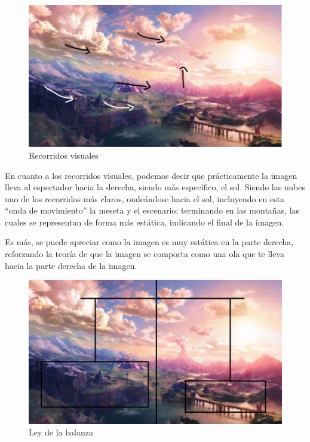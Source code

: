 \documentclass[12pt]{article}
\begin{document}
         \newpage
          \begin{figure}[H]
            \centering
            \includegraphics[width=\textwidth]{images/Jesus/Seccion2/Group 2.JPEG}
            \caption{Recorridos visuales}
          \end{figure}
          En cuanto a los recorridos visuales, podemos decir que prácticamente la imagen lleva al espectador hacia la derecha, siendo más específico, el sol. 
          Siendo las nubes uno de los recorridos más claros, ondeándose hacia el sol, incluyendo en esta “onda de movimiento” la meseta y el escenario; terminando en las montañas, las cuales se representan de forma más estática, indicando el final de la imagen. 

          Es más, se puede apreciar como la imagen es muy estática en la parte derecha, reforzando la teoría de que la imagen se comporta como una ola que te lleva hacia la parte derecha de la imagen.
          \newpage

          \begin{figure}[H]
            \centering
            \includegraphics[width=\textwidth]{Jesus/Seccion2/Group 6.JPEG}
            \caption{Ley de la balanza}
          \end{figure}
          
\end{document}

